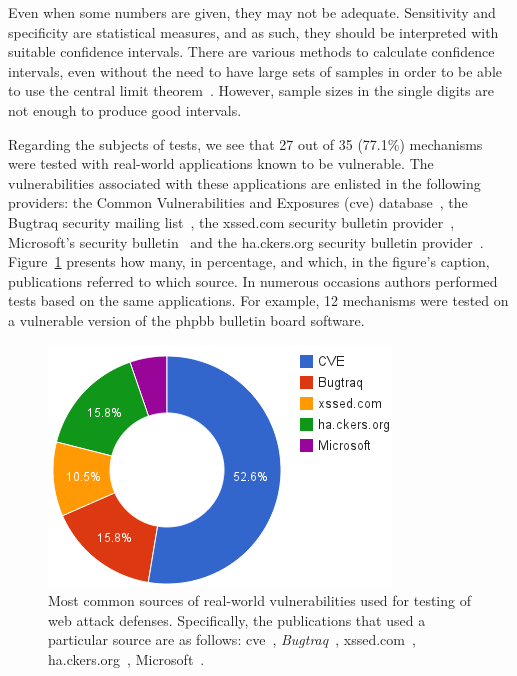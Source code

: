 \documentclass[conference]{IEEEtran}
\begin{document}
Even when some numbers are given, they may not be adequate.
Sensitivity and specificity are statistical measures, and as such,
they should be interpreted with suitable confidence intervals. There are
various methods to calculate confidence intervals, even without
the need to have large sets of samples in order to be able to use the
central limit theorem~\cite{agresti1998,brown2001}.
However, sample sizes in the single
digits are not enough to produce good intervals.

Regarding the subjects of tests, we see that 27 out of 35 (77.1\%)
mechanisms were tested with real-world applications known to be
vulnerable. The vulnerabilities associated with these applications
are enlisted in the following providers: the Common
Vulnerabilities and Exposures ({\sc cve}) database~\cite{cve},
the Bugtraq security mailing list~\cite{bugtraq}, the {\sc xss}ed.com
security bulletin provider~\cite{xssed}, Microsoft's security
bulletin~\cite{microsoftBulletin} and the
ha.ckers.org security bulletin provider~\cite{hackers}.
Figure~\ref{fig:defect_sources} presents how many, in percentage,
and which, in the figure's caption, publications referred
to which source. In numerous occasions authors performed tests based
on the same applications. For example, 12 mechanisms were tested on a
vulnerable version of the {\sc phpbb} bulletin board software.


\begin{figure}[t]
\begin{center}
\leavevmode
\includegraphics[scale=0.47]{defect-percentages.png}
\end{center}
\caption{\label{fig:defect_sources}Most common sources of real-world vulnerabilities
used for testing of web attack defenses.
Specifically, the publications that used a particular source are as follows:
{\sc cve}~\cite{XBS06,NLC07,PMP11,BK04,BV08,JB07,SMS13,WPLKK09,JKK06a,PS11},
{\it Bugtraq}~\cite{PB05,KKVJ06,JEP08},
{\sc xss}ed.com~\cite{NSS06,APKLM10},
ha.ckers.org~\cite{TNH07,PSC09,LV09},
Microsoft~\cite{RDWDE07}.}
\end{figure}
\end{document}
